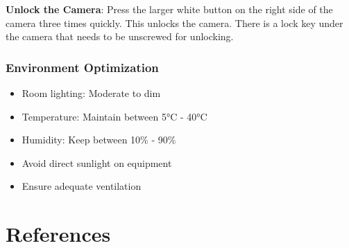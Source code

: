 \documentclass[
  Letterpaper,
]{scrbook}
\providecommand{\tightlist}{%
  \setlength{\itemsep}{0pt}\setlength{\parskip}{0pt}}\usepackage{longtable,booktabs,array}
\begin{document}
\textbf{Unlock the Camera}: Press the larger white button on the right
side of the camera three times quickly. This unlocks the camera. There
is a lock key under the camera that needs to be unscrewed for unlocking.

\subsection{Environment Optimization}\label{environment-optimization}

\begin{itemize}
\tightlist
\item
  Room lighting: Moderate to dim
\item
  Temperature: Maintain between 5°C - 40°C
\item
  Humidity: Keep between 10\% - 90\%
\item
  Avoid direct sunlight on equipment
\item
  Ensure adequate ventilation
\end{itemize}


\chapter*{References}\label{references}

\end{document}
